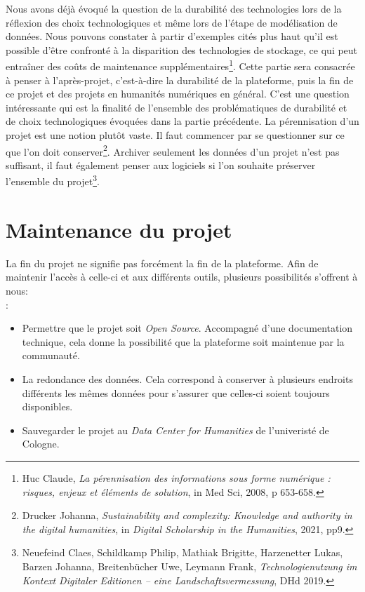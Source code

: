 Nous avons déjà évoqué la question de la durabilité des technologies lors de la réflexion des choix technologiques et même lors de l’étape de modélisation de données. Nous pouvons constater à partir d’exemples cités plus haut qu'il est possible d’être confronté à la disparition des technologies de stockage, ce qui peut entraîner des coûts de maintenance supplémentaires\footnote{Huc Claude, \textit{La pérennisation des informations sous forme numérique : risques, enjeux et éléments de solution}, in Med Sci, 2008, p 653-658.}. Cette partie sera consacrée à penser à l’après-projet, c’est-à-dire la durabilité de la plateforme, puis la fin de ce projet et des projets en humanités numériques en général. C’est une question intéressante qui est la finalité de l’ensemble des problématiques de durabilité et de choix technologiques évoquées dans la partie précédente.
La pérennisation d’un projet est une notion plutôt vaste. Il faut commencer par se questionner sur ce que l’on doit conserver\footnote{Drucker Johanna, \textit{Sustainability and complexity: Knowledge and authority in the digital humanities}, in \textit{Digital Scholarship in the Humanities}, 2021, pp9.}. Archiver seulement les données d’un projet n’est pas suffisant, il faut également penser aux logiciels si l’on souhaite préserver l’ensemble du projet\footnote{Neuefeind Claes, Schildkamp Philip, Mathiak Brigitte, Harzenetter Lukas, Barzen Johanna, Breitenbücher Uwe, Leymann Frank, \textit{Technologienutzung im Kontext Digitaler Editionen – eine Landschaftsvermessung}, DHd 2019.}.

\chapter{Maintenance du projet}

La fin du projet ne signifie pas forcément la fin de la plateforme. Afin de maintenir l’accès à celle-ci et aux différents outils, plusieurs possibilités s’offrent à nous: \\: 
\begin{itemize}
\item Permettre que le projet soit \textit{Open Source}. Accompagné d'une documentation technique, cela donne la possibilité que la plateforme soit maintenue par la communauté.
\item La redondance des données. Cela correspond à conserver à plusieurs endroits différents les mêmes données pour s'assurer que celles-ci soient toujours disponibles.
\item Sauvegarder le projet au \textit{Data Center for Humanities} de l'univeristé de Cologne.
\end{itemize}

